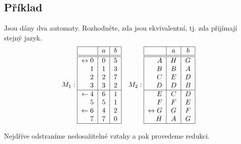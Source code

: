 \subsection{Příklad}
Jsou dány dva automaty. Rozhodněte, zda jsou ekvivalentní, tj. zda přijímají stejný jazyk.
\[
M_1:
\begin{tabular}{|r|c|c|}
    \hline
    & $a$ & $b$\\
    \hline
    \hline
    $\leftrightarrow 0$& $0$ & $5$\\
    $1$                & $1$ & $3$\\
    $2$                & $2$ & $7$\\
    $3$                & $3$ & $2$\\
    \hline
    $\leftarrow 4$     & $6$ & $1$\\
    $5$                & $5$ & $1$\\
    $\leftarrow 6$     & $4$ & $2$\\
    $7$                & $7$ & $0$\\
    \hline
\end{tabular}
\quad
M_2:
\begin{tabular}{|r|c|c|}
    \hline
    & $a$ & $b$\\
    \hline
    \hline
    $A$                & $H$ & $G$\\
    $B$                & $B$ & $A$\\
    $C$                & $E$ & $D$\\
    $D$                & $D$ & $B$\\
    \hline
    $E$                & $C$ & $D$\\
    $F$                & $F$ & $E$\\
    $\leftrightarrow G$& $G$ & $F$\\
    $H$                & $A$ & $G$\\
    \hline
\end{tabular}
\]

Nejdříve odstraníme nedosažitelné vztahy a pak provedeme redukci. 

